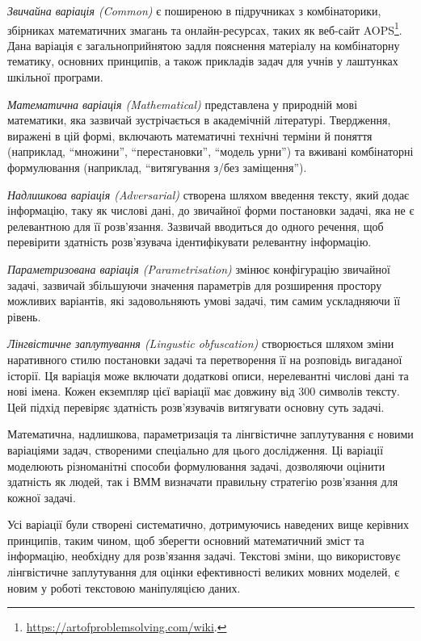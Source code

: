 \emph{Звичайна варіація (Common)} є поширеною в підручниках з комбінаторики, збірниках математичних змагань та онлайн-ресурсах, таких як веб-сайт AOPS\footnote{\url{https://artofproblemsolving.com/wiki}.}. Дана варіація є загальноприйнятою задля пояснення матеріалу на комбінаторну тематику, основних принципів, а також прикладів задач для учнів у лаштунках шкільної програми.

\emph{Математична варіація (Mathematical)} представлена у природній мові математики, яка зазвичай зустрічається в академічній літературі. Твердження, виражені в цій формі, включають математичні технічні терміни й поняття (наприклад, ``множини'', ``перестановки'', ``модель урни'') та вживані комбінаторні формулювання (наприклад, ``витягування з/без заміщення'').

\emph{Надлишкова варіація (Adversarial)} створена шляхом введення тексту, який додає інформацію, таку як числові дані, до звичайної форми постановки задачі, яка не є релевантною для її розв'язання. Зазвичай вводиться до одного речення, щоб перевірити здатність розв'язувача ідентифікувати релевантну інформацію.

\emph{Параметризована варіація (Parametrisation)} змінює конфігурацію звичайної задачі, зазвичай збільшуючи значення параметрів для розширення простору можливих варіантів, які задовольняють умові задачі, тим самим ускладняючи її рівень.

\emph{Лінгвістичне заплутування (Lingustic obfuscation)} створюється шляхом зміни наративного стилю постановки задачі та перетворення її на розповідь вигаданої історії. Ця варіація може включати додаткові описи, нерелевантні числові дані та нові імена. Кожен екземпляр цієї варіації має довжину від 300 символів тексту. Цей підхід перевіряє здатність розв'язувачів витягувати основну суть задачі.

Математична, надлишкова, параметризація та лінгвістичне заплутування є новими варіаціями задач, створеними спеціально для цього дослідження. Ці варіації моделюють різноманітні способи формулювання задачі, дозволяючи оцінити здатність як людей, так і ВММ визначати правильну стратегію розв'язання для кожної задачі.

Усі варіації були створені систематично, дотримуючись наведених вище керівних принципів, таким чином, щоб зберегти основний математичний зміст та інформацію, необхідну для розв'язання задачі. Текстові зміни, що використовує лінгвістичне заплутування для оцінки ефективності великих мовних моделей, є новим у роботі текстовою маніпуляцією даних.

